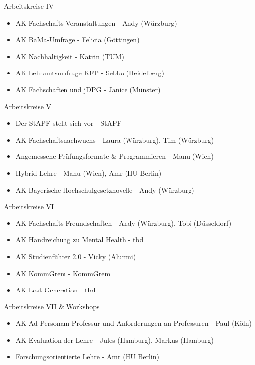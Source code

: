 \begin{frame}{Arbeitskreise IV}
	\begin{itemize}
		\item AK Fachschafts-Veranstaltungen - Andy (Würzburg)
		\item AK BaMa-Umfrage - Felicia (Göttingen)
		\item AK Nachhaltigkeit - 	Katrin (TUM)
		\item AK Lehramtsumfrage KFP - Sebbo (Heidelberg)
		\item AK Fachschaften und jDPG - Janice (Münster)
	\end{itemize}
\end{frame}

\begin{frame}{Arbeitskreise V}
	\begin{itemize}
		\item Der StAPF stellt sich vor - StAPF
		\item AK Fachschaftsnachwuchs - Laura (Würzburg), Tim (Würzburg) 
		\item Angemessene Prüfungsformate \& Programmieren - Manu (Wien) 
		\item Hybrid Lehre - Manu (Wien), Amr (HU Berlin)
		\item AK Bayerische Hochschulgesetznovelle	- Andy (Würzburg) 
	\end{itemize}
\end{frame}

\begin{frame}{Arbeitskreise VI}
	\begin{itemize}
		\item AK Fachschafts-Freundschaften - Andy (Würzburg), Tobi (Düsseldorf)
		\item AK Handreichung zu Mental Health - tbd 
		\item AK Studienführer 2.0 - Vicky (Alumni) 
		\item AK KommGrem - KommGrem 
		\item AK Lost Generation - tbd
	\end{itemize}
\end{frame}

\begin{frame}{Arbeitskreise VII \& Workshops}
	\begin{itemize}
		\item AK Ad Personam Professur und Anforderungen an Professuren - Paul (Köln)
		\item AK Evaluation der Lehre - Jules (Hamburg), Markus (Hamburg)
		\item Forschungsorientierte Lehre - Amr (HU Berlin)
	\end{itemize}
\end{frame}

